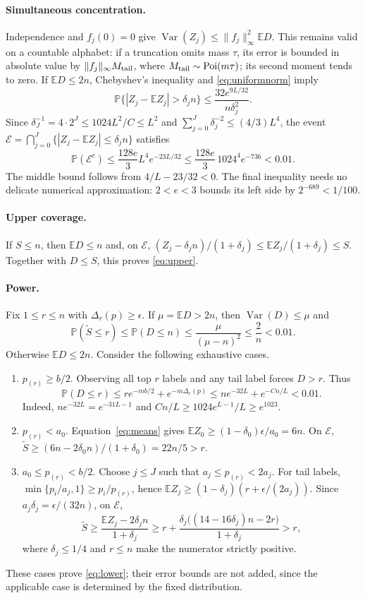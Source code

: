 \documentclass[10pt]{article}
\newcommand{\E}{\mathbb E}
\newcommand{\Prob}{\mathbb P}
\newcommand{\Var}{\operatorname{Var}}
\newcommand{\Poi}{\operatorname{Poi}}
\begin{document}
\paragraph{Simultaneous concentration.}
Independence and $f_j(0)=0$ give
$\Var(Z_j)\le\|f_j\|_\infty^2\E D$.
This remains valid on a countable alphabet: if a truncation omits mass
$\tau$, its error is bounded in absolute value by $\|f_j\|_\infty M_{\rm tail}$,
where $M_{\rm tail}\sim\Poi(m\tau)$; its second moment tends to zero.
If $\E D\le2n$, Chebyshev's inequality and \eqref{eq:uniformnorm} imply
\[
 \Prob\{|Z_j-\E Z_j|>\delta_jn\}
 \le\frac{32e^{9L/32}}{n\delta_j^2}.
\]
Since $\delta_J^{-1}=4\cdot2^J\le1024L^2/C\le L^2$ and
$\sum_{j=0}^J\delta_j^{-2}\le(4/3)L^4$, the event
$\mathcal E=\bigcap_{j=0}^J\{|Z_j-\E Z_j|\le\delta_jn\}$ satisfies
\begin{equation}
 \Prob(\mathcal E^c)\le\frac{128e}{3}L^4e^{-23L/32}
 \le\frac{128e}{3}\,1024^4e^{-736}<0.01.
 \label{eq:concentration}
\end{equation}
The middle bound follows from $4/L-23/32<0$. The final inequality needs
no delicate numerical approximation: $2<e<3$ bounds its left side by
$2^{-689}<1/100$.

\paragraph{Upper coverage.}
If $S\le n$, then $\E D\le n$ and, on $\mathcal E$,
$(Z_j-\delta_jn)/(1+\delta_j)\le\E Z_j/(1+\delta_j)\le S$.
Together with $D\le S$, this proves \eqref{eq:upper}.

\paragraph{Power.}
Fix $1\le r\le n$ with $\Delta_r(p)\ge\epsilon$. If $\mu=\E D>2n$,
then $\Var(D)\le\mu$ and
\[
 \Prob(\widetilde S\le r)\le\Prob(D\le n)
 \le\frac{\mu}{(\mu-n)^2}\le\frac2n<0.01.
\]
Otherwise $\E D\le2n$. Consider the following exhaustive cases.
\begin{enumerate}[label=(\roman*)]
\item $p_{(r)}\ge b/2$. Observing all top $r$ labels and any tail label
forces $D>r$. Thus
\[
 \Prob(D\le r)\le re^{-mb/2}+e^{-m\Delta_r(p)}
 \le ne^{-32L}+e^{-Cn/L}<0.01.
\]
Indeed, $ne^{-32L}=e^{-31L-1}$ and
$Cn/L\ge1024e^{L-1}/L\ge e^{1023}$.
\item $p_{(r)}<a_0$. Equation~\eqref{eq:means} gives
$\E Z_0\ge(1-\delta_0)\epsilon/a_0=6n$. On $\mathcal E$,
$\widetilde S\ge(6n-2\delta_0n)/(1+\delta_0)=22n/5>r$.
\item $a_0\le p_{(r)}<b/2$. Choose $j\le J$ such that
$a_j\le p_{(r)}<2a_j$. For tail labels,
$\min\{p_i/a_j,1\}\ge p_i/p_{(r)}$, hence
$\E Z_j\ge(1-\delta_j)(r+\epsilon/(2a_j))$. Since
$a_j\delta_j=\epsilon/(32n)$, on $\mathcal E$,
\[
 \widetilde S\ge\frac{\E Z_j-2\delta_jn}{1+\delta_j}
 \ge r+\frac{\delta_j\bigl((14-16\delta_j)n-2r\bigr)}{1+\delta_j}>r,
\]
where $\delta_j\le1/4$ and $r\le n$ make the numerator strictly positive.
\end{enumerate}
These cases prove \eqref{eq:lower}; their error bounds are not added,
since the applicable case is determined by the fixed distribution.
\end{document}
